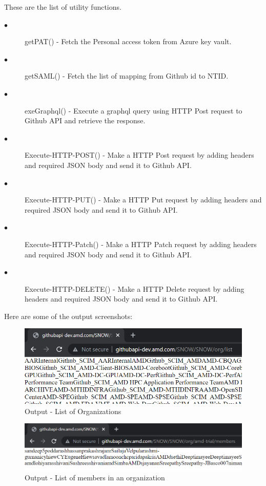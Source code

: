 These are the list of utility functions.
\begin{description}

\item[$\bullet$] getPAT() - Fetch the Personal access token from Azure key vault.

\item[$\bullet$] getSAML() - Fetch the list of mapping from Github id to NTID.

\item[$\bullet$] exeGraphql() - Execute a graphql query using HTTP Post request to Github API and retrieve the response.

\item[$\bullet$] Execute-HTTP-POST() - Make a HTTP Post request by adding headers and required JSON body and send it to Github API.

\item[$\bullet$] Execute-HTTP-PUT() - Make a HTTP Put request by adding headers and required JSON body and send it to Github API.

\item[$\bullet$] Execute-HTTP-Patch() - Make a HTTP Patch request by adding headers and required JSON body and send it to Github API.

\item[$\bullet$] Execute-HTTP-DELETE() - Make a HTTP Delete request by adding headers and required JSON body and send it to Github API.

\end{description}
Here are some of the output screenshots:

\begin{figure}[H]
\centering
\includegraphics[width = .8\textwidth]{Images/SNOWORGLIST}
\caption{Output - List of Organizations}
\label{List of organizations}
\end{figure}

\begin{figure}[H]
\centering
\includegraphics[width = .8\textwidth]{Images/LISTMEMBERS}
\caption{Output - List of members in an organization}
\label{List of members in an organization}
\end{figure}


